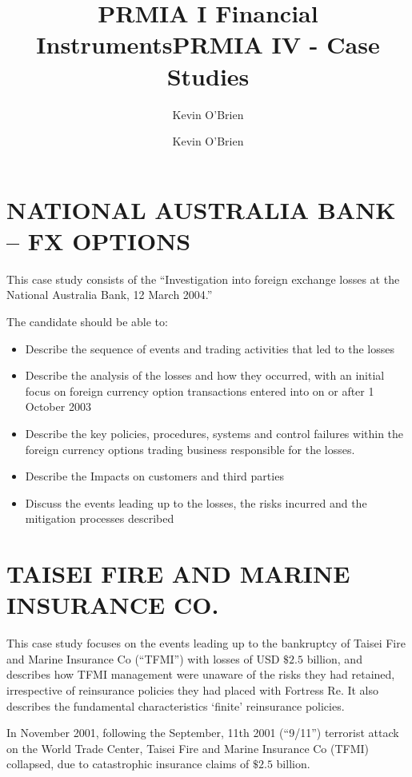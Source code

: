 \documentclass[]{article}
\title{PRMIA I Financial Instruments}
\author{Kevin O'Brien}
\begin{document}
\maketitle
\tableofcontents

\title{PRMIA IV  - Case Studies}
\author{Kevin O'Brien}



\newpage
\section{NATIONAL AUSTRALIA BANK – FX OPTIONS}
This case study consists of the “Investigation into foreign exchange losses at the National Australia Bank, 12 March 2004.”

The candidate should be able to:
\begin{itemize}
\item Describe the sequence of events and trading activities that led to the losses
\item Describe the analysis of the losses and how they occurred, with an initial
focus on foreign currency option transactions entered into on or after
1 October 2003
\item Describe the key policies, procedures, systems and control failures within
the foreign currency options trading business responsible for the losses.
\item Describe the Impacts on customers and third parties
\item Discuss the events leading up to the losses, the risks incurred and the
mitigation processes described
\end{itemize}
\newpage
\section{TAISEI FIRE AND MARINE INSURANCE CO.}
This case study focuses on the events leading up to the bankruptcy of Taisei Fire and Marine Insurance Co
(“TFMI”) with losses of USD $\$2.5$ billion, and describes how TFMI management were unaware of the risks they had
retained, irrespective of reinsurance policies they had placed with Fortress Re. It also describes the fundamental
characteristics ‘finite’ reinsurance policies.

 
In November 2001, following the September, 11th 2001 (“9/11”) terrorist attack on the World Trade
Center, Taisei Fire and Marine Insurance Co (TFMI) collapsed, due to catastrophic insurance claims of
$\$2.5$ billion. 
 
\end{document}
